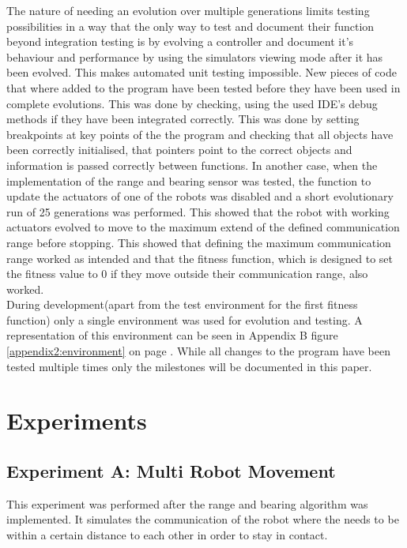 The nature of needing an evolution over multiple generations limits testing possibilities in a way that the only way to test and document their function beyond integration testing is by evolving a controller and document it's behaviour and performance by using the simulators viewing mode after it has been evolved.
This makes automated unit testing impossible.
New pieces of code that where added to the program have been tested before they have been used in complete evolutions.
This was done by checking, using the used IDE's debug methods  if they have been integrated correctly. This was done by setting breakpoints at key points of the the program and checking that all objects have been correctly initialised, that pointers point to the correct objects and information is passed correctly between functions.
In another case, when the implementation of the range and bearing sensor was tested, the function to update the actuators of one of the robots was disabled and a short evolutionary run of 25 generations was performed.
This showed that the robot with working actuators evolved to move to the maximum extend of the defined communication range before stopping. 
This showed that defining the maximum communication range worked as intended and that the fitness function, which is designed to set the fitness value to 0 if they move outside their communication range, also worked.\\

During development(apart from the test environment for the first fitness function) only a single environment was used for evolution and testing.
A representation of this environment can be seen in Appendix B figure \ref{appendix2:environment} on page \pageref{appendix2:environment}.
While all changes to the program have been tested multiple times only the milestones will be documented in this paper. 

\section{Experiments}
\subsection{Experiment A: Multi Robot Movement}
\label{chap4:movement}
This experiment was performed after the range and bearing algorithm was implemented. It simulates the communication of the robot where the needs to be within a certain distance to each other in order to stay in contact.\\


